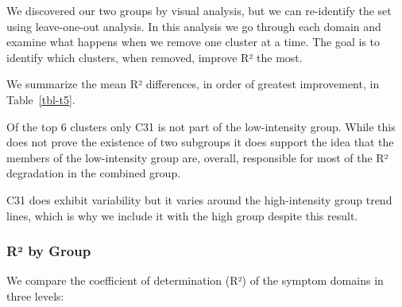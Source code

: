 \documentclass[
  letterpaper,
  DIV=11,
  numbers=noendperiod]{scrartcl}
\begin{document}
We discovered our two groups by visual analysis, but we can re-identify
the set using leave-one-out analysis. In this analysis we go through
each domain and examine what happens when we remove one cluster at a
time. The goal is to identify which clusters, when removed, improve R²
the most.

We summarize the mean R² differences, in order of greatest improvement,
in Table~\ref{tbl-t5}.

\begin{table}[h]

\caption{\label{tbl-t5}Leave-one-out}


\end{table}%

Of the top 6 clusters only C31 is not part of the low-intensity group.
While this does not prove the existence of two subgroups it does support
the idea that the members of the low-intensity group are, overall,
responsible for most of the R² degradation in the combined group.

C31 does exhibit variability but it varies around the high-intensity
group trend lines, which is why we include it with the high group
despite this result.

\FloatBarrier 
\bigskip

\subsubsection*{R² by Group}\label{sec-r2-group}

We compare the coefficient of determination (R²) of the symptom domains
in three levels:
\end{document}
